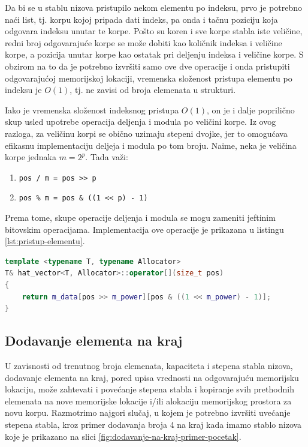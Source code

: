 \documentclass[a4paper]{article}
\begin{document}
Da bi se u stablu nizova pristupilo nekom elementu po indeksu, prvo je potrebno naći list, tj. korpu kojoj pripada dati indeks, pa onda i tačnu poziciju koja odgovara indeksu unutar te korpe. Pošto su koren i sve korpe stabla iste veličine, redni broj odgovarajuće korpe se može dobiti kao količnik indeksa i veličine korpe, a pozicija unutar korpe kao ostatak pri deljenju indeksa i veličine korpe. S obzirom na to da je potrebno izvršiti samo ove dve operacije i onda pristupiti odgovarajućoj memorijskoj lokaciji, vremenska složenost pristupa elementu po indeksu je $O(1)$, tj. ne zavisi od broja elemenata u strukturi.

Iako je vremenska složenost indeksnog pristupa $O(1)$, on je i dalje poprilično skup usled upotrebe operacija deljenja i modula po veličini korpe. Iz ovog razloga, za veličinu korpi se obično uzimaju stepeni dvojke, jer to omogućava efikasnu implementaciju deljeja i modula po tom broju. Naime, neka je veličina korpe jednaka $m = 2^p$. Tada važi:
\begin{enumerate}
    \item \verb|pos / m = pos >> p|
    \item \verb|pos % m = pos & ((1 << p) - 1)|
\end{enumerate}
Prema tome, skupe operacije deljenja i modula se mogu zameniti jeftinim bitovskim operacijama. Implementacija ove operacije je prikazana u listingu \ref{lst:pristup-elementu}.

\begin{lstlisting}[language=C++, caption={Operacija pristupa elementu po indeksu \textit{pos}}, captionpos=b, label={lst:pristup-elementu}]
template <typename T, typename Allocator>
T& hat_vector<T, Allocator>::operator[](size_t pos)
{
    return m_data[pos >> m_power][pos & ((1 << m_power) - 1)];
}
\end{lstlisting}

\subsection{Dodavanje elementa na kraj}

U zavisnosti od trenutnog broja elemenata, kapaciteta i stepena stabla nizova, dodavanje elementa na kraj, pored upisa vrednosti na odgovarajuću memorijsku lokaciju, može zahtevati i povećanje stepena stabla i kopiranje svih prethodnih elemenata na nove memorijske lokacije i/ili alokaciju memorijskog prostora za novu korpu. Razmotrimo najgori slučaj, u kojem je potrebno izvršiti uvećanje stepena stabla, kroz primer dodavanja broja 4 na kraj kada imamo stablo nizova koje je prikazano na slici \ref{fig:dodavanje-na-kraj-primer-pocetak}.
\end{document}

